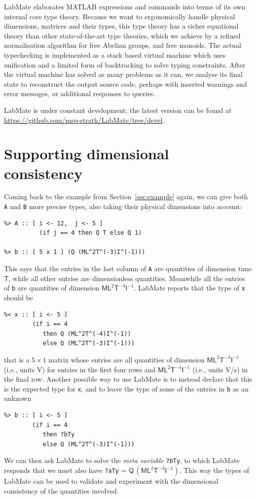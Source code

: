 \documentclass{IMEKO2024}
\newcommand{\remph}{\emph}
\begin{document}
LabMate elaborates MATLAB expressions and commands into terms of its own internal core type theory.
%
Because we want to ergonomically handle physical dimensions, matrices
and their types, this type theory has a richer equational theory than
other state-of-the-art type theories, which we achieve by a refined
normalisation algorithm for free Abelian groups, and free monoids.
%
The actual typechecking is implemented as a stack based virtual machine which uses unification and a limited form of backtracking to solve typing constraints.
%
After the virtual machine has solved as many problems as it can, we analyse its final state to reconstruct the output source code, perhaps with inserted warnings and error messages, or additional responses to queries.

LabMate is under constant development; the latest version can be found at \url{https://github.com/msp-strath/LabMate/tree/devel}.

\section{Supporting dimensional consistency}
\label{sec:example-revisited}


Coming back to the example from Section~\ref{sec:example} again, we can give both \texttt{A} and \texttt{B} more precise types, also taking their physical dimensions into account:
\begin{verbatim}
%> A :: [ i <- 12,  j <- 5 ]
          (if j == 4 then Q T else Q 1)

%> b :: [ 5 x 1 ] (Q (ML^2T^(-3)I^(-1)))
\end{verbatim}
This says that the entries in the last column of \texttt{A} are quantities of dimension time $\mathsf{T}$, while all other entries are dimensionless quantities. Meanwhile all the entries of \texttt{b} are quantities of dimension $\mathsf{ML}^{2}\mathsf{T}^{-3}\mathsf{I}^{-1}$. LabMate reports that the type of \texttt{x} should be
\begin{verbatim}
%< x :: [ i <- 5 ]
        (if i == 4
           then Q (ML^2T^(-4)I^(-1))
           else Q (ML^2T^(-3)I^(-1)))
\end{verbatim}
that is a $5 \times 1$ matrix whose entries are all quantities of dimension $\mathsf{ML}^{2}\mathsf{T}^{-3}\mathsf{I}^{-1}$ (i.e., units V) for entries in the first four rows and $\mathsf{ML}^{2}\mathsf{T}^{-4}\mathsf{I}^{-1}$ (i.e., units V/s) in the final row.
%
Another possible way to use LabMate is to instead declare that this is the expected type for \texttt{x}, and to leave the type of some of the entries in \texttt{b} as an unknown
\begin{verbatim}
%> b :: [ i <- 5 ]
        (if i == 4
           then ?bTy
           else Q (ML^2T^(-3)I^(-1)))
\end{verbatim}
We can then ask LabMate to solve the \remph{meta variable} \texttt{?bTy}, to which LabMate responds that we must also have \texttt{?aTy} = $\mathsf{Q}\,(\mathsf{ML}^{2}\mathsf{T}^{-3}\mathsf{I}^{-1})$. This way the types of LabMate can be used to validate and experiment with the dimensional consistency of the quantities involved.
\end{document}
